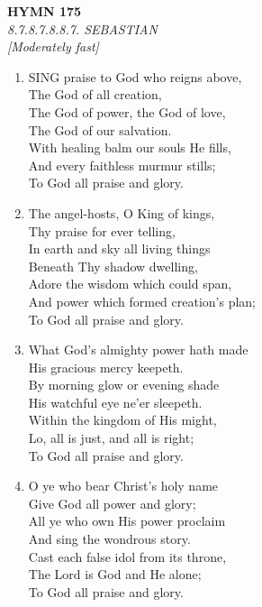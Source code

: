 \newpage
\begin{center}
    {\Large \textbf{HYMN 175}}
    \\
    \textit{8.7.8.7.8.8.7. SEBASTIAN}
    \\
    \textit{\small [Moderately fast]}
\end{center}
\vspace{1em}

\begin{enumerate}
    \item SING praise to God who reigns above, \\
        The God of all creation, \\
        The God of power, the God of love, \\
        The God of our salvation. \\
        With healing balm our souls He fills, \\
        And every faithless murmur stills; \\
        To God all praise and glory.

    \item The angel-hosts, O King of kings, \\
        Thy praise for ever telling, \\
        In earth and sky all living things \\
        Beneath Thy shadow dwelling, \\
        Adore the wisdom which could span, \\
        And power which formed creation's plan; \\
        To God all praise and glory.

    \item What God's almighty power hath made \\
        His gracious mercy keepeth. \\
        By morning glow or evening shade \\
        His watchful eye ne'er sleepeth. \\
        Within the kingdom of His might, \\
        Lo, all is just, and all is right; \\
        To God all praise and glory.

    \item O ye who bear Christ's holy name \\
        Give God all power and glory; \\
        All ye who own His power proclaim \\
        And sing the wondrous story. \\
        Cast each false idol from its throne, \\
        The Lord is God and He alone; \\
        To God all praise and glory.

\end{enumerate}

